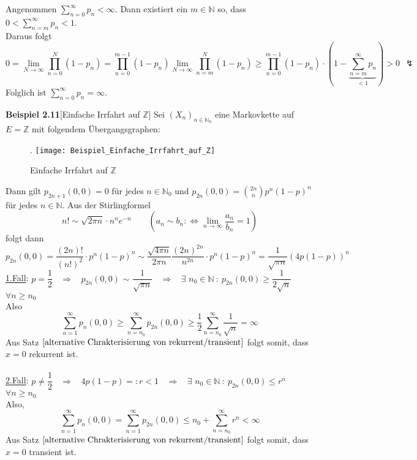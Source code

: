 Angenommen $\sum_{n=0}^{\infty}p_{n} < \infty$. Dann existiert ein $m \in \mathbb{N}$ so, dass $0 < \sum_{n=m}^{\infty} p_{n} < 1$.
\\
Daraus folgt
\begin{equation*}
0 = \lim_{N \to \infty} \prod_{n=0}^{N} (1-p_{n}) = \prod_{n=0}^{m-1} (1-p_{n})  \lim_{N \to \infty} \prod_{n=m}^{N} (1-p_{n}) \geq \prod_{n=0}^{m-1} (1-p_{n}) \cdot (1 - \underbrace{\sum_{n=m}^{\infty} p_{n}}_{<1}) > 0 \: \: \lightning
\end{equation*}
Folglich ist $\sum_{n=0}^{\infty} p_{n} = \infty$.

\textbf{Beispiel 2.11}[Einfache Irrfahrt auf $\mathbb{Z}$]
Sei $(X_{n})_{n \in \mathbb{N}_{0}}$ eine Markovkette auf $E=\mathbb{Z}$ mit folgendem Übergangsgraphen:
\begin{figure}[H].
\centering
\texttt{[image: Beispiel\_Einfache\_Irrfahrt\_auf\_Z]}
\caption{Einfache Irrfahrt auf $\mathbb{Z}$}
\end{figure}
\noindent
Dann gilt $p_{2n+1}(0,0) = 0$ für jedes $n \in \mathbb{N}_{0}$ und $p_{2n}(0,0) = \binom{2n}{n} p^{n} (1-p)^{n}$ für jedes $n \in \mathbb{N}$. Aus der Stirlingformel
\begin{equation*}
n! \sim \sqrt{2 \pi n} \cdot n^{n} e^{-n} \qquad (a_{n} \sim b_{n} :\Leftrightarrow \lim_{n \to \infty} \dfrac{a_{n}}{b_{n}} = 1)
\end{equation*}
folgt dann
\begin{equation*}
p_{2n}(0,0) = \dfrac{(2n)!}{(n!)^{2}} \cdot p^{n}(1-p)^{n} \sim \dfrac{\sqrt{4 \pi n}}{2 \pi n} \dfrac{(2n)^{2n}}{n^{2n}} \cdot p^{n} (1-p)^{n} = \dfrac{1}{\sqrt{\pi n}} (4p(1-p))^{n}
\end{equation*}
\underline{1.Fall}: $p=\dfrac{1}{2}$ $\:$  $\Rightarrow$ $\:$  $p_{2n}(0,0)$ $\sim$ $\dfrac{1}{\sqrt{\pi n}}$ $\:$  $\Rightarrow$ $\:$ $\exists$ $n_{0} \in \mathbb{N} \: : \: p_{2n}(0,0) \geq \dfrac{1}{2\sqrt{n}}$ $\:$  $\forall n \geq n_{0}$
\\
Also
\begin{equation*}
\sum_{n=1}^{\infty} p_{n}(0,0) \geq \sum_{n=n_{0}}^{\infty}p_{2n}(0,0) \geq \dfrac{1}{2} \sum_{n=n_{0}}^{\infty}\dfrac{1}{\sqrt{n}} = \infty
\end{equation*}
Aus Satz $\ref{alternative Chrakterisierung von rekurrent/transient}$ folgt somit, dass $x=0$ rekurrent ist.
\\
\\
\underline{2.Fall}: $p \neq \dfrac{1}{2}$ $\:$  $\Rightarrow$ $\:$ $4p(1-p) =: r < 1$ $\:$  $\Rightarrow$ $\:$ $\exists$ $n_{0} \in \mathbb{N} \: : \: p_{2n}(0,0) \leq r^{n}$ $\:$  $\forall n \geq n_{0}$
\\
Also,
\begin{equation*}
\sum_{n=1}^{\infty} p_{n}(0,0) = \sum_{n=1}^{\infty} p_{2n}(0,0) \leq n_{0} + \sum_{n=n_{0}}^{\infty} r^{n} < \infty
\end{equation*}
Aus Satz $\ref{alternative Chrakterisierung von rekurrent/transient}$ folgt somit, dass $x=0$ transient ist.

